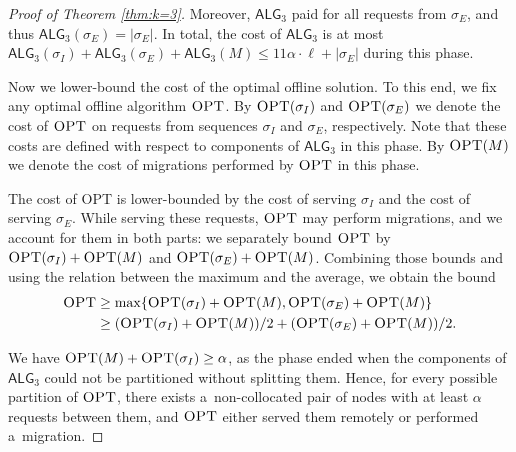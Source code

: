 \documentclass[a4paper,anonymous,USenglish]{lipics-v2019}
\newcommand{\OPT}{\textsc{OPT}\xspace}
\newcommand{\TAlg}{{\ensuremath{\textsf{ALG}_{3}}}\xspace}
\newcommand\maciek[1]{\color{brown}\textbf{(Maciek: #1)}\color{black}}
\begin{document}
\begin{proof}[Proof of Theorem \ref{thm:k=3}]
	
	Moreover, \TAlg paid for all requests from $\sigma_E$, and thus $\TAlg(\sigma_E) = |\sigma_E|$.
	In total, the cost of \TAlg is at most $\TAlg(\sigma_I) + \TAlg(\sigma_E) + \TAlg(M) \leq 11\alpha\cdot \ell + |\sigma_E|$ during this phase.
	
	\medskip
	
	Now we lower-bound the cost of the optimal offline solution.
	To this end, we fix any optimal offline algorithm $\OPT$.
	By $\OPT(\sigma_I)$ and $\OPT(\sigma_E)$ we denote the cost of $\OPT$ on requests from sequences $\sigma_I$ and $\sigma_E$, respectively.
	Note that these costs are defined with respect to components of \TAlg in this phase.
	By $\OPT(M)$ we denote the cost of migrations performed by $\OPT$ in this phase.
	
	The cost of \OPT is lower-bounded by the cost of serving $\sigma_I$ and the cost of serving $\sigma_E$.
	While serving these requests, $\OPT$ may perform migrations, and we account for them in both parts: we separately bound $\OPT$ by $\OPT(\sigma_I) + \OPT(M)$ and $\OPT(\sigma_E) + \OPT(M)$.
	Combining those bounds and using the relation between the maximum and the average, we obtain the bound
	\begin{align*}
		\OPT&\geq \max\{\OPT(\sigma_I) + \OPT(M), \OPT(\sigma_E) + \OPT(M)\}\\
		&\geq (\OPT(\sigma_I) + \OPT(M)) / 2 + (\OPT(\sigma_E) + \OPT(M)) / 2.
	\end{align*}
	
	
	We have $\OPT(M) + \OPT(\sigma_I) \geq \alpha$, as the phase ended when the components of \TAlg{} could not be partitioned without splitting them.
	Hence, for every possible partition of $\OPT$, there exists a~non-collocated pair of nodes with at least $\alpha$ requests between them, and
	$\OPT$ either served them remotely or performed a~migration.
	

\end{proof}
\end{document}
